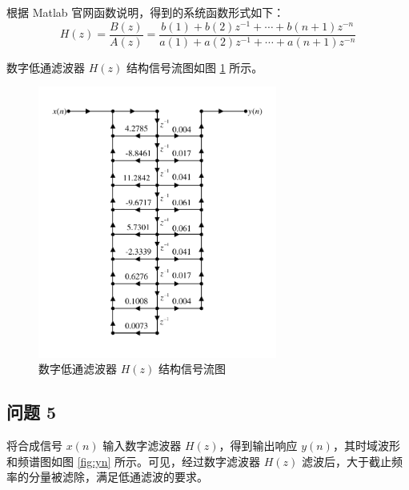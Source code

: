\documentclass[12pt,AutoFakeBold]{article}
\begin{document}
根据 Matlab 官网函数说明，得到的系统函数形式如下：
%
\begin{equation}
H(z)=\frac{B(z)}{A(z)}=\frac{b(1)+b(2)z^{-1}+\cdots+b(n+1)z^{-n}}{a(1)+a(2)z^{-1}+\cdots+a(n+1)z^{-n}}
\end{equation}

数字低通滤波器 $H(z)$ 结构信号流图如图 \ref{fig:signalflow} 所示。

\begin{figure}[htbp]
	\centering
	\includegraphics[width=0.7\textwidth]{figure/signalflow.pdf}
	\caption{数字低通滤波器 $H(z)$ 结构信号流图} \label{fig:signalflow}
\end{figure}

\subsection{问题 5}

将合成信号 $x(n)$ 输入数字滤波器 $H(z)$，得到输出响应 $y(n)$，其时域波形和频谱图如图 \ref{fig:yn} 所示。可见，经过数字滤波器 $H(z)$ 滤波后，大于截止频率的分量被滤除，满足低通滤波的要求。
\end{document}
